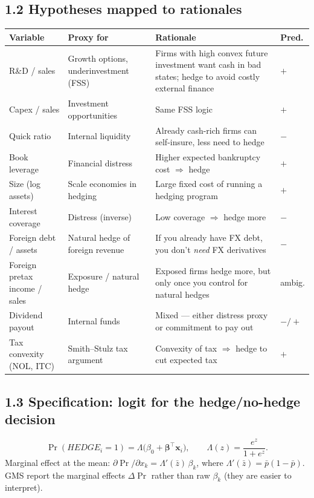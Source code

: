 \documentclass[11pt]{article}
\begin{document}
\subsection*{1.2 Hypotheses mapped to rationales}
\begin{tabular}{p{3.4cm}p{3.6cm}p{4.8cm}p{1.6cm}}
\toprule
\textbf{Variable} & \textbf{Proxy for} & \textbf{Rationale} & \textbf{Pred.} \\
\midrule
R\&D / sales & Growth options, \newline underinvestment (FSS) & Firms with high convex future investment want cash in bad states; hedge to avoid costly external finance & $+$ \\
Capex / sales & Investment opportunities & Same FSS logic & $+$ \\
Quick ratio & Internal liquidity & Already cash-rich firms can self-insure, less need to hedge & $-$ \\
Book leverage & Financial distress & Higher expected bankruptcy cost $\Rightarrow$ hedge & $+$ \\
Size (log assets) & Scale economies in hedging & Large fixed cost of running a hedging program & $+$ \\
Interest coverage & Distress (inverse) & Low coverage $\Rightarrow$ hedge more & $-$ \\
Foreign debt / assets & Natural hedge of foreign revenue & If you already have FX debt, you don't \emph{need} FX derivatives & $-$ \\
Foreign pretax income / sales & Exposure / natural hedge & Exposed firms hedge more, but only once you control for natural hedges & ambig. \\
Dividend payout & Internal funds & Mixed --- either distress proxy or commitment to pay out & $-/+$ \\
Tax convexity (NOL, ITC) & Smith--Stulz tax argument & Convexity of tax $\Rightarrow$ hedge to cut expected tax & $+$ \\
\bottomrule
\end{tabular}

\subsection*{1.3 Specification: logit for the hedge/no-hedge decision}
\[
\Pr(HEDGE_i=1)=\Lambda\bigl(\beta_0+\bm{\beta}^\top \mathbf{x}_i\bigr),\qquad \Lambda(z)=\frac{e^z}{1+e^z}.
\]
Marginal effect at the mean: $\partial\Pr/\partial x_k=\Lambda'(\bar z)\,\beta_k$, where $\Lambda'(\bar z)=\bar p(1-\bar p)$. GMS report the marginal effects $\Delta\!\Pr$ rather than raw $\beta_k$ (they are easier to interpret).
\end{document}
